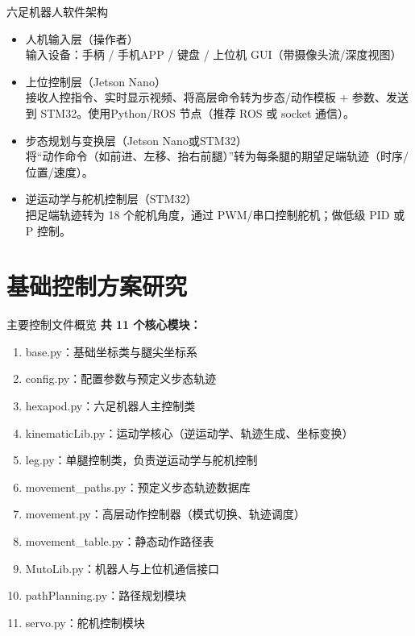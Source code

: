 \documentclass{beamer}
\begin{document}
\begin{frame}{六足机器人软件架构}
    \begin{itemize}
        \item 人机输入层（操作者）
        \\ 输入设备：手柄 / 手机APP / 键盘 / 上位机 GUI（带摄像头流/深度视图）
        \item 上位控制层（Jetson Nano）
        \\ 接收人控指令、实时显示视频、将高层命令转为步态/动作模板 + 参数、发送到 STM32。使用Python/ROS 节点（推荐 ROS 或 socket 通信）。
        \item 步态规划与变换层（Jetson Nano或STM32）
        \\ 将“动作命令（如前进、左移、抬右前腿）”转为每条腿的期望足端轨迹（时序/位置/速度）。
        \item 逆运动学与舵机控制层（STM32）
        \\ 把足端轨迹转为 18 个舵机角度，通过 PWM/串口控制舵机；做低级 PID 或 P 控制。
    \end{itemize}
\end{frame}

\section{基础控制方案研究}

\begin{frame}{主要控制文件概览}
    \textbf{共 11 个核心模块：}
    \begin{enumerate}
        \item base.py：基础坐标类与腿尖坐标系
        \item config.py：配置参数与预定义步态轨迹
        \item hexapod.py：六足机器人主控制类
        \item kinematicLib.py：运动学核心（逆运动学、轨迹生成、坐标变换）
        \item leg.py：单腿控制类，负责逆运动学与舵机控制
        \item movement\_paths.py：预定义步态轨迹数据库
        \item movement.py：高层动作控制器（模式切换、轨迹调度）
        \item movement\_table.py：静态动作路径表
        \item MutoLib.py：机器人与上位机通信接口
        \item pathPlanning.py：路径规划模块
        \item servo.py：舵机控制模块
    \end{enumerate}
\end{frame}
\end{document}

